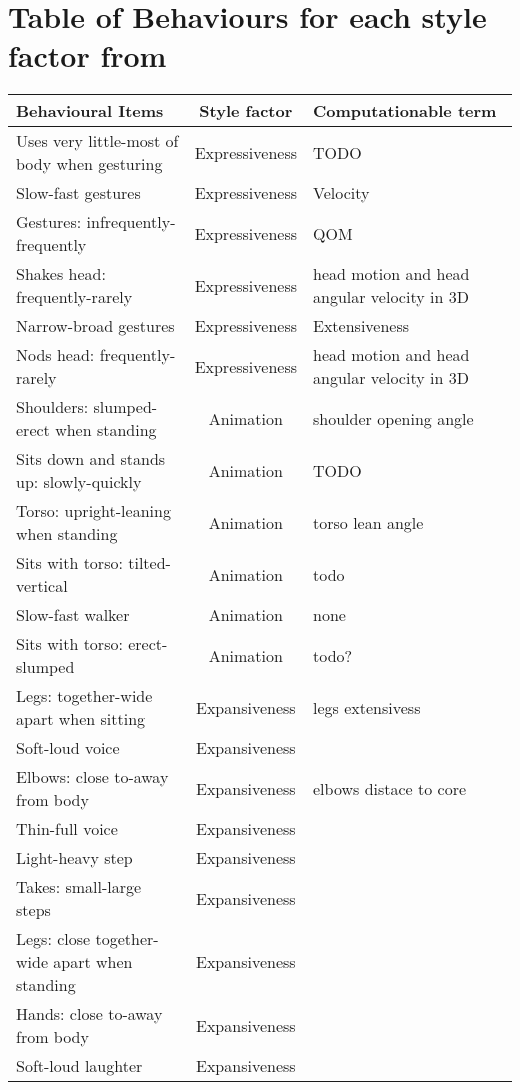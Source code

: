 \documentclass[smallextended]{svjour3}
\begin{document}



\section{Table of Behaviours for each style factor from \cite{Gallaher1992}}
\label{tab:styledims_gallaher}
\begin{table}[h]
	\small
	\centering
	\begin{tabular}{|l |c|  l |}\hline
		\textbf{Behavioural Items}  &	\textbf{Style factor} & Computationable term \\ \hline
		Uses very little-most of body when gesturing & Expressiveness  & TODO \\
		Slow-fast gestures  & Expressiveness & Velocity \\
		Gestures: infrequently-frequently & Expressiveness & QOM\\
		Shakes head: frequently-rarely & Expressiveness &  head motion and head angular velocity in 3D\\
		Narrow-broad gestures & Expressiveness & Extensiveness \\
		Nods head: frequently-rarely & Expressiveness & head motion and head angular velocity in 3D \\ \hline
		
		Shoulders: slumped-erect when standing & Animation & shoulder opening angle\\
		Sits down and stands up: slowly-quickly & Animation & TODO\\
		Torso: upright-leaning when standing & Animation & torso lean angle\\
		Sits with torso: tilted-vertical & Animation & todo\\
		Slow-fast walker & Animation & none\\
		Sits with torso: erect-slumped & Animation & todo? \\ \hline
		
		Legs: together-wide apart when sitting & Expansiveness & legs extensivess\\
		Soft-loud voice & Expansiveness\\
		Elbows: close to-away from body & Expansiveness & elbows distace to core\\
		Thin-full voice & Expansiveness\\
		Light-heavy step & Expansiveness\\
		Takes: small-large steps & Expansiveness\\
		Legs: close together-wide apart when standing  & Expansiveness\\
		Hands: close to-away from body & Expansiveness \\ 
		Soft-loud laughter & Expansiveness\\ \hline
		

\end{tabular}
\end{table}
\end{document}
